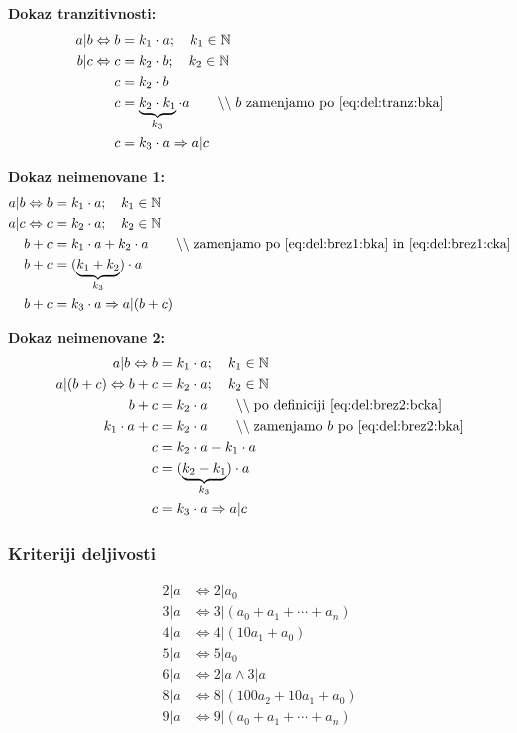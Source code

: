 \documentclass[a4paper,oneside,12pt,fleqn]{article}
\def\N{\ensuremath{\mathbb N}}
\newcommand\krat\cdot
\newcommand{\comment}[1]{\ensuremath{\qquad\backslash\backslash\;}\textnormal{#1}}
\renewcommand\implies\Rightarrow
\renewcommand\iff\Leftrightarrow
\numberwithin{equation}{section}
\begin{document}
\textbf{Dokaz tranzitivnosti:}
\begin{align}
  a|b \iff b &= k_1 \krat a; \quad k_1 \in \N \label{eq:del:tranz:bka} \\
  b|c \iff c &= k_2 \krat b; \quad k_2 \in \N \label{eq:del:tranz:ckb} \\
  c &= k_2 \krat b \\
  c &= \underbrace{k_2 \krat k_1}_{k_3} \krat a \comment{$b$ zamenjamo po \eqref{eq:del:tranz:bka}} \\
  c &= k_3 \krat a \implies a|c
\end{align}

\textbf{Dokaz neimenovane 1:}
\begin{align}
  a|b \iff b &= k_1 \krat a; \quad k_1 \in \N \label{eq:del:brez1:bka} \\
  a|c \iff c &= k_2 \krat a; \quad k_2 \in \N \label{eq:del:brez1:cka} \\
  b + c &= k_1 \krat a + k_2 \krat a \comment{zamenjamo po \eqref{eq:del:brez1:bka} in
  \eqref{eq:del:brez1:cka}} \\
  b + c &= (\underbrace{k_1 + k_2}_{k_3}) \krat a \\
  b + c &= k_3 \krat a \implies a|(b+c)
\end{align}

\textbf{Dokaz neimenovane 2:}
\begin{align}
  a|b \iff b &= k_1 \krat a; \quad k_1 \in \N \label{eq:del:brez2:bka} \\
  a|(b+c) \iff b+c &= k_2 \krat a; \quad k_2 \in \N \label{eq:del:brez2:bcka} \\
  b + c &= k_2 \krat a \comment{po definiciji \eqref{eq:del:brez2:bcka}} \\
  k_1 \krat a + c &= k_2 \krat a \comment{zamenjamo $b$ po \eqref{eq:del:brez2:bka}} \\
  c &= k_2 \krat a - k_1 \krat a \\
  c &= (\underbrace{k_2 - k_1}_{k_3}) \krat a \\
  c &= k_3 \krat a \implies a|c
\end{align}

\subsubsection{Kriteriji deljivosti}
\begin{align*}
  2|a &\iff 2|a_0 \\
  3|a &\iff 3|(a_0 + a_1 + \cdots + a_n) \\
  4|a &\iff 4|(10a_1+a_0) \\
  5|a &\iff 5|a_0 \\
  6|a &\iff 2|a \land 3|a \\
  8|a &\iff 8|(100a_2 + 10a_1+a_0) \\
  9|a &\iff 9|(a_0 + a_1 + \cdots + a_n) 
\end{align*}
\end{document}
